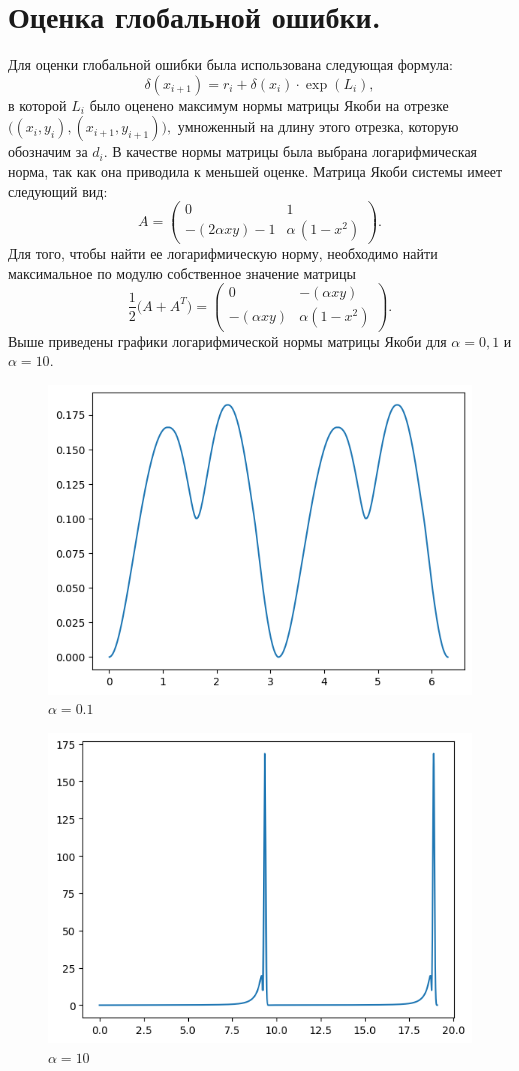 \documentclass{article}
\begin{document}
\section{Оценка глобальной ошибки.}
Для оценки глобальной ошибки была использована следующая формула:
$$
\delta\left(x_{i+1}\right)=r_i+\delta\left(x_i\right) \cdot \exp \left(L_i\right),
$$
в которой $L_i$ было оценено максимум нормы матрицы Якоби на отрезке $\big((x_i,y_i),(x_{i+1},y_{i+1})\big),$ умноженный на длину этого отрезка, которую обозначим за $d_i$. В качестве нормы матрицы была выбрана логарифмическая норма, так как она приводила к меньшей оценке.
Матрица Якоби системы имеет следующий вид:
$$A = \begin{pmatrix}0 & 1\\
-\left( 2 \alpha x y\right) -1 & \alpha \, \left( 1-{{x}^{2}}\right) \end{pmatrix}.$$
Для того, чтобы найти ее логарифмическую норму, необходимо найти максимальное по модулю собственное значение матрицы
$$\frac{1}{2}\big(A + A^T\big) = \begin{pmatrix}0 & -\left( \alpha x y\right) \\
-\left( \alpha x y\right)  & \alpha \left( 1-{{x}^{2}}\right) \end{pmatrix}.$$
 Выше приведены графики логарифмической нормы матрицы Якоби для $\alpha = 0,1$ и $\alpha = 10$.
\begin{figure}
    \centering
    \includegraphics[width=0.5\linewidth]{images/image.png}
    \caption{$\alpha = 0.1$}
    \label{fig:enter-label}
\end{figure}
\begin{figure}
    \centering
    \includegraphics[width=0.5\linewidth]{images/log10.png}
    \caption{$\alpha = 10$}
    \label{fig:enter-label}
\end{figure}
\end{document}
